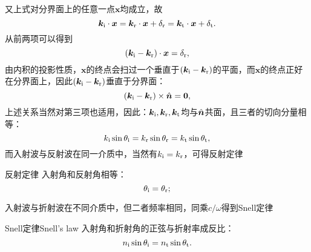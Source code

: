又上式对分界面上的任意一点$\bm x$均成立，故
\[
    \bm k_{\mathrm{i}}\cdot\bm x=\bm k_\text r\cdot\bm x+\delta_\text r=\bm k_\text t\cdot\bm x+\delta_\text t.
\]
从前两项可以得到
\[
    (\bm k_{\mathrm{i}}-\bm k_\text r)\cdot\bm x=\delta_\text r,
\]
由内积的投影性质，$\bm x$的终点会扫过一个垂直于$(\bm k_{\mathrm{i}}-\bm k_\text r)$的平面，而$\bm x$的终点正好在分界面上，因此$(\bm k_{\mathrm{i}}-\bm k_\text r)$垂直于分界面：
\[
    (\bm k_{\mathrm{i}}-\bm k_\text r)\times\mathop{}\!\hat{\bm{n}}=\bm 0,
\]
上述关系当然对第三项也适用，因此：$\bm k_{\mathrm{i}},\bm k_\text r,\bm k_\text t$均与$\mathop{}\!\hat{\bm{n}}$共面，且三者的切向分量相等：
\begin{equation}
    k_{\mathrm{i}}\sin\theta_{\mathrm{i}}=k_\text r\sin\theta_\text r=k_\text t\sin\theta_\text t,
\end{equation}
而入射波与反射波在同一介质中，当然有$k_{\mathrm{i}}=k_\text r$，可得反射定律
\begin{theorem}{反射定律}{}
    入射角和反射角相等：
    \begin{equation}
        \theta_{\mathrm{i}}=\theta_\text r;
    \end{equation}
\end{theorem}
入射波与折射波在不同介质中，但二者频率相同，同乘$c/\omega$得到Snell定律
\begin{theorem}{Snell定律}{Snell's law}
    入射角和折射角的正弦与折射率成反比：
    \begin{equation}
        \label{eqn:Snell}
        n_{\mathrm{i}}\sin\theta_{\mathrm{i}}=n_\text t\sin\theta_\text t.
    \end{equation}
\end{theorem}
